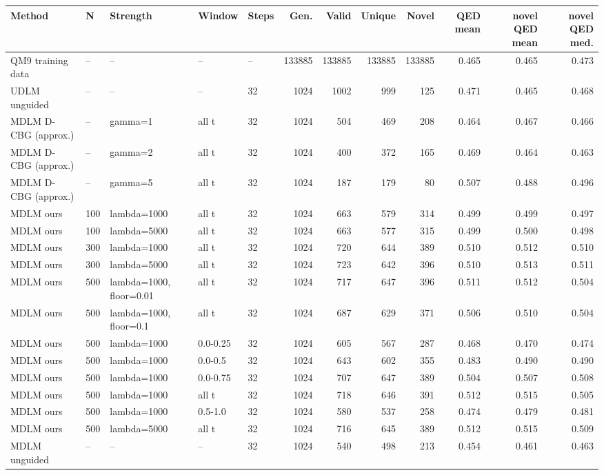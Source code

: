 \begin{tabular}{lllllrrrrrrr}
\toprule
Method & N & Strength & Window & Steps & Gen. & Valid & Unique & Novel & QED mean & novel QED mean & novel QED med. \\
\midrule
QM9 training data & -- & -- & -- & -- & 133885 & 133885 & 133885 & 133885 & 0.465 & 0.465 & 0.473 \\
UDLM unguided & -- & -- & -- & 32 & 1024 & 1002 & 999 & 125 & 0.471 & 0.465 & 0.468 \\
MDLM D-CBG (approx.) & -- & gamma=1 & all t & 32 & 1024 & 504 & 469 & 208 & 0.464 & 0.467 & 0.466 \\
MDLM D-CBG (approx.) & -- & gamma=2 & all t & 32 & 1024 & 400 & 372 & 165 & 0.469 & 0.464 & 0.463 \\
MDLM D-CBG (approx.) & -- & gamma=5 & all t & 32 & 1024 & 187 & 179 & 80 & 0.507 & 0.488 & 0.496 \\
MDLM ours & 100 & lambda=1000 & all t & 32 & 1024 & 663 & 579 & 314 & 0.499 & 0.499 & 0.497 \\
MDLM ours & 100 & lambda=5000 & all t & 32 & 1024 & 663 & 577 & 315 & 0.499 & 0.500 & 0.498 \\
MDLM ours & 300 & lambda=1000 & all t & 32 & 1024 & 720 & 644 & 389 & 0.510 & 0.512 & 0.510 \\
MDLM ours & 300 & lambda=5000 & all t & 32 & 1024 & 723 & 642 & 396 & 0.510 & 0.513 & 0.511 \\
MDLM ours & 500 & lambda=1000, floor=0.01 & all t & 32 & 1024 & 717 & 647 & 396 & 0.511 & 0.512 & 0.504 \\
MDLM ours & 500 & lambda=1000, floor=0.1 & all t & 32 & 1024 & 687 & 629 & 371 & 0.506 & 0.510 & 0.504 \\
MDLM ours & 500 & lambda=1000 & 0.0-0.25 & 32 & 1024 & 605 & 567 & 287 & 0.468 & 0.470 & 0.474 \\
MDLM ours & 500 & lambda=1000 & 0.0-0.5 & 32 & 1024 & 643 & 602 & 355 & 0.483 & 0.490 & 0.490 \\
MDLM ours & 500 & lambda=1000 & 0.0-0.75 & 32 & 1024 & 707 & 647 & 389 & 0.504 & 0.507 & 0.508 \\
MDLM ours & 500 & lambda=1000 & all t & 32 & 1024 & 718 & 646 & 391 & 0.512 & 0.515 & 0.505 \\
MDLM ours & 500 & lambda=1000 & 0.5-1.0 & 32 & 1024 & 580 & 537 & 258 & 0.474 & 0.479 & 0.481 \\
MDLM ours & 500 & lambda=5000 & all t & 32 & 1024 & 716 & 645 & 389 & 0.512 & 0.515 & 0.509 \\
MDLM unguided & -- & -- & -- & 32 & 1024 & 540 & 498 & 213 & 0.454 & 0.461 & 0.463 \\

\end{tabular}
